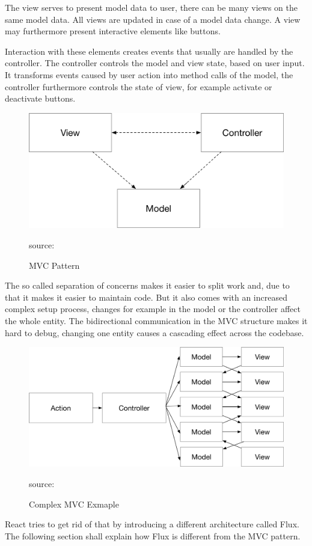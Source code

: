 The view serves to present model data to user, there can be many views on the same model data. All views are updated in case of a model data change. A view may furthermore present interactive elements like buttons. 
 
Interaction with these elements creates events that usually are handled by the controller. The controller controls the model and view state, based on user input. It transforms events caused by user action into method calls of the model, the controller furthermore controls the state of view, for example activate or deactivate buttons.


\begin{figure}[H]
	\centering
	\includegraphics[width=\linewidth]{bilder/grundlagen/MVC.png}
	\caption{MVC Pattern} source:\cite{GOLL}
	\label{fig:MVC}
\end{figure}


The so called separation of concerns makes it easier to split work and, due to that it makes it easier to maintain code. But it also comes with an increased complex setup process, changes for example in the model or the controller affect the whole entity. The bidirectional communication in the MVC structure makes it hard to debug, changing one entity  causes a cascading effect across the codebase.

\begin{figure}[H]
	\centering
	\includegraphics[width=\linewidth]{bilder/grundlagen/mvcComplex.png}
	\caption{Complex MVC Exmaple} source:\cite{MVCExample}
	\label{fig:MVCExample}
\end{figure}
React tries to get rid of that by introducing a different architecture called Flux. The following section shall explain how Flux is different from the MVC pattern.

